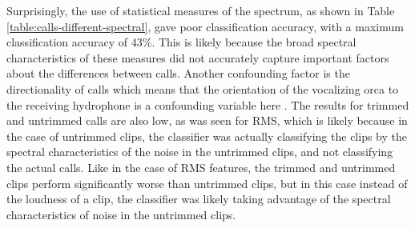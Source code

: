 Surprisingly, the use of statistical measures of the spectrum, as
shown in Table \ref{table:calls-different-spectral}, gave poor
classification accuracy, with a maximum classification accuracy of
43\%.  This is likely because the broad spectral characteristics of
these measures did not accurately capture important factors about the
differences between calls.  Another confounding factor is the
directionality of calls which means that the orientation of the
vocalizing orca to the receiving hydrophone is a confounding variable
here \cite{miller2002mixed}.  The results for trimmed and untrimmed
calls are also low, as was seen for RMS, which is likely because in
the case of untrimmed clips, the classifier was actually classifying
the clips by the spectral characteristics of the noise in the
untrimmed clips, and not classifying the actual calls.  Like in the
case of RMS features, the trimmed and untrimmed clips perform
significantly worse than untrimmed clips, but in this case instead of
the loudness of a clip, the classifier was likely taking advantage of
the spectral characteristics of noise in the untrimmed clips.

